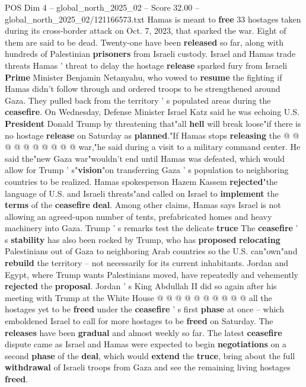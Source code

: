 \begin{textsample}{POS Dim 4 – global\_north\_2025\_02 – Score 32.00 – global\_north\_2025\_02/121166573.txt}
Hamas is meant to \textbf{free} 33 hostages taken during its cross-border attack on Oct. 7, 2023, that sparked the war.
Eight of them are said to be dead.
Twenty-one have been \textbf{released} so far, along with hundreds of Palestinian \textbf{prisoners} from Israeli custody.
Israel and Hamas trade threats Hamas ' threat to delay the hostage \textbf{release} sparked fury from Israeli \textbf{Prime} Minister Benjamin Netanyahu, who vowed to \textbf{resume} the fighting if Hamas didn't follow through and ordered troops to be strengthened around Gaza.
They pulled back from the territory ' s populated areas during the \textbf{ceasefire}.
On Wednesday, Defense Minister Israel Katz said he was echoing U.S. \textbf{President} Donald Trump by threatening that"all \textbf{hell} will break loose"if there is no hostage \textbf{release} on Saturday as \textbf{planned}."If Hamas stops \textbf{releasing} the @ @ @ @ @ @ @ @ @ @ war,"he said during a visit to a military command center.
He said the"new Gaza war"wouldn't end until Hamas was defeated, which would allow for Trump ' s"\textbf{vision}"on transferring Gaza ' s population to neighboring countries to be realized.
Hamas spokesperson Hazem Kassem \textbf{rejected}"the language of U.S. and Israeli threats"and called on Israel to \textbf{implement} the \textbf{terms} of the \textbf{ceasefire} \textbf{deal}.
Among other claims, Hamas says Israel is not allowing an agreed-upon number of tents, prefabricated homes and heavy machinery into Gaza.
Trump ' s remarks test the delicate \textbf{truce} The \textbf{ceasefire} ' s \textbf{stability} has also been rocked by Trump, who has \textbf{proposed} \textbf{relocating} Palestinians out of Gaza to neighboring Arab countries so the U.S. can"own"and \textbf{rebuild} the territory -- not necessarily for its current inhabitants.
Jordan and Egypt, where Trump wants Palestinians moved, have repeatedly and vehemently \textbf{rejected} the \textbf{proposal}.
Jordan ' s King Abdullah II did so again after his meeting with Trump at the White House @ @ @ @ @ @ @ @ @ @ all the hostages yet to be \textbf{freed} under the \textbf{ceasefire} ' s first \textbf{phase} at once -- which emboldened Israel to call for more hostages to be \textbf{freed} on Saturday.
The \textbf{releases} have been \textbf{gradual} and almost weekly so far.
The latest \textbf{ceasefire} dispute came as Israel and Hamas were expected to begin \textbf{negotiations} on a second \textbf{phase} of the \textbf{deal}, which would \textbf{extend} the \textbf{truce}, bring about the full \textbf{withdrawal} of Israeli troops from Gaza and see the remaining living hostages \textbf{freed}.

\end{textsample}
